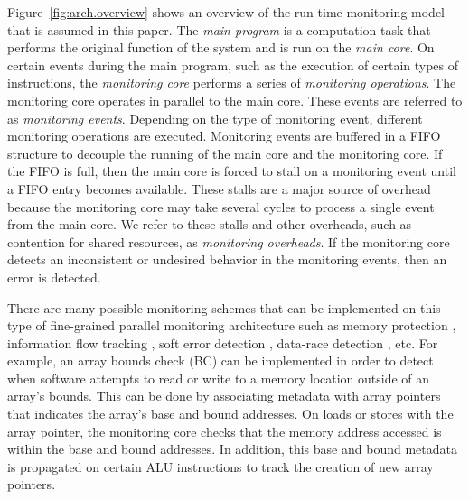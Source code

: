 Figure~\ref{fig:arch.overview} shows an overview of the run-time monitoring
model that is assumed in this paper.  The \emph{main program} is a computation
task that performs the original function of the system and is run on the
\emph{main core}.  On certain events during the main program, such as the
execution of certain types of instructions, the \emph{monitoring core} performs a
series of \emph{monitoring operations}. The monitoring core operates in parallel to the
main core. These events are referred to as \emph{monitoring events}. Depending
on the type of monitoring event, different monitoring operations are
executed. Monitoring events are buffered in a FIFO structure to decouple the
running of the main core and the monitoring core. If the FIFO is full, then the main
core is forced to stall on a monitoring event until a FIFO entry becomes
available. These stalls are a major source of
overhead because the monitoring core may take several cycles to process a single event
from the main core. We refer to these stalls and other overheads, such as
contention for shared resources, as \emph{monitoring overheads}. If the monitoring core
detects an inconsistent or undesired behavior in the monitoring events, then
an error is detected. 

There are many possible monitoring schemes that can be implemented on this type
of fine-grained parallel monitoring architecture such as memory protection
\cite{mondrian-asplos02}, information flow tracking \cite{dift-asplos04,
testudo-micro08}, soft error detection \cite{argus-micro07}, data-race
detection \cite{cord-hpca06}, etc.  For example, an array bounds check (BC)
\cite{hardbound-asplos08} can be implemented in order to detect
when software attempts to read or write to a memory location outside of an
array's bounds. This can be done by associating metadata with array pointers that 
indicates the array's base and bound addresses. On loads or stores with the
array
pointer, the monitoring core checks that the memory address accessed is within the base and
bound addresses. In addition, this base and bound metadata
is propagated on certain ALU instructions to track the creation of new array pointers.

